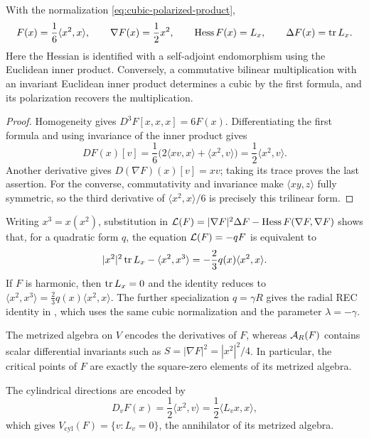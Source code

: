 \begin{proposition}
\label{prop:cubic-multiplication-dictionary}
With the normalization \eqref{eq:cubic-polarized-product},
\begin{equation}\label{eq:cubic-multiplication-dictionary}
 F(x)=\frac16\langle x^2,x\rangle,\qquad
 \nabla F(x)=\frac12x^2,\qquad
 \operatorname{Hess} F(x)=L_x,\qquad \Delta F(x)=\operatorname{tr} L_x.
\end{equation}
Here the Hessian is identified with a self-adjoint endomorphism using
the Euclidean inner product. Conversely, a commutative bilinear
multiplication with an invariant Euclidean inner product determines a
cubic by the first formula, and its polarization recovers the multiplication.
\end{proposition}

\begin{proof}
Homogeneity gives \(D^3F[x,x,x]=6F(x)\). Differentiating the
first formula and using invariance of the inner product gives
\[
 DF(x)[v]=\frac16\bigl(2\langle xv,x\rangle+
                         \langle x^2,v\rangle\bigr)
        =\frac12\langle x^2,v\rangle.
\]
Another derivative gives \(D(\nabla F)(x)[v]=xv\); taking its
trace proves the last assertion. For the converse, commutativity and
invariance make \(\langle xy,z\rangle\) fully symmetric, so the
third derivative of \(\langle x^2,x\rangle/6\) is precisely this
trilinear form.
\end{proof}

Writing \(x^3=x(x^2)\), substitution in
\(\mathcal L(F)=|\nabla F|^2\Delta F-
\operatorname{Hess} F(\nabla F,\nabla F)\) shows that, for a quadratic form \(q\),
the equation \(\mathcal L(F)=-qF\) is equivalent to
\[
 |x^2|^2\operatorname{tr} L_x-\langle x^2,x^3\rangle
 =-\frac23q(x)\langle x^2,x\rangle.
\]
If \(F\) is harmonic, then \(\operatorname{tr} L_x=0\) and the identity reduces to
\(\langle x^2,x^3\rangle=\frac23q(x)\langle x^2,x\rangle\).
The further specialization \(q=\gamma R\) gives the radial REC
identity in \cite[Proposition~6.4.1]{NadirashviliTkachevVladut14},
which uses the same cubic normalization and the parameter
\(\lambda=-\gamma\).

The metrized algebra on \(V\) encodes the derivatives of \(F\), whereas
\(\mathcal A_R(F)\) contains scalar differential invariants such as
\(S=|\nabla F|^2=|x^2|^2/4\). In particular, the critical points
of \(F\) are exactly the square-zero elements of its metrized algebra.

The cylindrical directions are encoded by
\[
 D_vF(x)=\frac12\langle x^2,v\rangle
        =\frac12\langle L_vx,x\rangle,
\]
which gives \(V_{\mathrm{cyl}}(F)=\{v:L_v=0\}\), the annihilator
of its metrized algebra.

